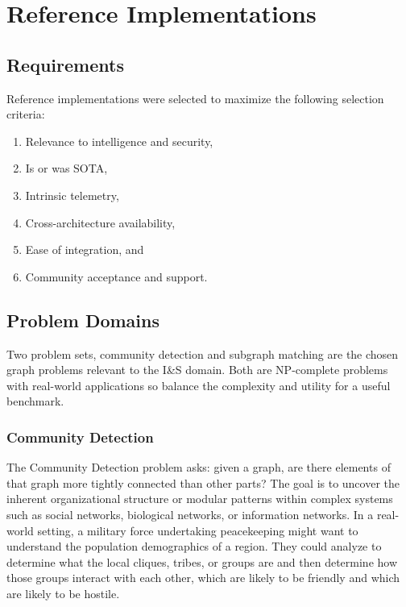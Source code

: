 \section{Reference Implementations}\label{section:implementations}

\subsection{Requirements}
    Reference implementations were selected to maximize the following selection criteria:
    \begin{enumerate}
        \itemsep0em
        \item Relevance to intelligence and security,
        \item Is or was SOTA,
        \item Intrinsic telemetry,
        \item Cross-architecture availability,
        \item Ease of integration, and
        \item Community acceptance and support.
    \end{enumerate}
    
\subsection{Problem Domains}
    Two problem sets, community detection and subgraph matching are the chosen graph problems relevant to the I\&S domain. 
    Both are NP-complete problems with real-world applications so balance the complexity and utility for a useful benchmark.    

    \subsubsection{Community Detection}
        The Community Detection problem asks: given a graph, are there elements of that graph more tightly connected than other parts? 
        The goal is to uncover the inherent organizational structure or modular patterns within complex systems such as social networks, biological networks, or information networks. 
        In a real-world setting, a military force undertaking peacekeeping might want to understand the population demographics of a region. 
        They could analyze to determine what the local cliques, tribes, or groups are and then determine how those groups interact with each other, which are likely to be friendly and which are likely to be hostile.

